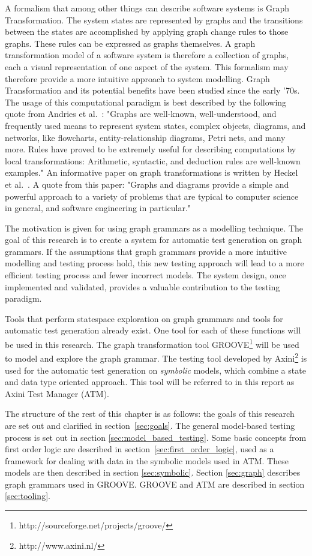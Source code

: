 A formalism that among other things can describe software systems is Graph Transformation. The system states are represented by graphs and the transitions between the states are accomplished by applying graph change rules to those graphs. These rules can be expressed as graphs themselves. A graph transformation model of a software system is therefore a collection of graphs, each a visual representation of one aspect of the system. This formalism may therefore provide a more intuitive approach to system modelling. Graph Transformation and its potential benefits have been studied since the early '70s. The usage of this computational paradigm is best described by the following quote from Andries et al.~\cite{Andries1999}: "Graphs are well-known, well-understood, and frequently used means to represent system states, complex objects, diagrams, and networks, like flowcharts, entity-relationship diagrams, Petri nets, and many more. Rules have proved to be extremely useful for describing computations by local transformations: Arithmetic, syntactic, and deduction rules are well-known examples." An informative paper on graph transformations is written by Heckel et al.~\cite{Heckel2006187}. A quote from this paper: "Graphs and diagrams provide a simple and powerful approach to a variety of problems that are typical to computer science in general, and software engineering in particular."

The motivation is given for using graph grammars as a modelling technique. The goal of this research is to create a system for automatic test generation on graph grammars. If the assumptions that graph grammars provide a more intuitive modelling and testing process hold, this new testing approach will lead to a more efficient testing process and fewer incorrect models. The system design, once implemented and validated, provides a valuable contribution to the testing paradigm.

Tools that perform statespace exploration on graph grammars and tools for automatic test generation already exist. One tool for each of these functions will be used in this research. The graph transformation tool GROOVE\footnote{http://sourceforge.net/projects/groove/} will be used to model and explore the graph grammar. The testing tool developed by Axini\footnote{http://www.axini.nl/} is used for the automatic test generation on \textit{symbolic} models, which combine a state and data type oriented approach. This tool will be referred to in this report as Axini Test Manager (ATM).

The structure of the rest of this chapter is as follows: the goals of this research are set out and clarified in section~\ref{sec:goals}. The general model-based testing process is set out in section \ref{sec:model_based_testing}. Some basic concepts from first order logic are described in section~\ref{sec:first_order_logic}, used as a framework for dealing with data in the symbolic models used in ATM. These models are then described in section \ref{sec:symbolic}. Section \ref{sec:graph} describes graph grammars used in GROOVE. GROOVE and ATM are described in section \ref{sec:tooling}.
